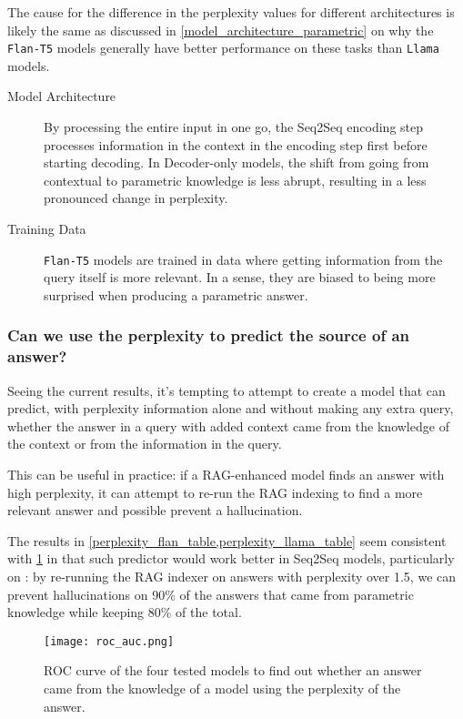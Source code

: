 The cause for the difference in the perplexity values for different architectures is likely the same as discussed in \cref{model_architecture_parametric} on why the \texttt{Flan-T5} models generally have better performance on these tasks than \texttt{Llama} models.
\begin{description}
	\item[Model Architecture] By processing the entire input in one go, the Seq2Seq encoding step processes information in the context in the encoding step first before starting decoding. In Decoder-only models, the shift from going from contextual to parametric knowledge is less abrupt, resulting in a less pronounced change in perplexity.
	\item[Training Data] \texttt{Flan-T5} models are trained in data where getting information from the query itself is more relevant.
		In a sense, they are biased to being more surprised when producing a parametric answer.
\end{description}

\subsubsection{Can we use the perplexity to predict the source of an answer?}

Seeing the current results, it's tempting to attempt to create a model that can predict, with perplexity information alone and without making any extra query, whether the answer in a query with added context came from the \Parametric{} knowledge of the context or from the \Contextual{} information in the query.

This can be useful in practice: if a RAG-enhanced model finds an answer with high perplexity, it can attempt to re-run the RAG indexing to find a more relevant answer and possible prevent a hallucination.

The results in \cref{perplexity_flan_table,perplexity_llama_table} seem consistent with \cref{roc_auc} in that such predictor would work better in Seq2Seq models, particularly on \bigflan{}: by re-running the RAG indexer on answers with perplexity over 1.5, we can prevent hallucinations on 90\% of the answers that came from parametric knowledge while keeping 80\% of the total.

\begin{figure}[hb]
	\centering
	\texttt{[image: roc\_auc.png]}
	\caption{ROC curve of the four tested models to find out whether an answer came from the \Parametric{} knowledge of a model using the perplexity of the answer.}
	\label{roc_auc}
\end{figure}
